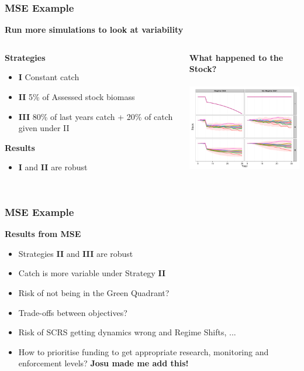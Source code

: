 \begin{frame}\frametitle{MSE Example}
\smallskip\textbf{Run more simulations to look at variability}\smallskip\\
\begin{columns}[t] 
\begin{column}[T]{4cm} %
     \smallskip\textbf{Strategies}\smallskip\\
       \Fontviii
       \begin{itemize}
          \item \textbf{I} Constant catch
          \item \textbf{II} 5\% of Assessed stock biomass
          \item \textbf{III} 80\% of last years catch + 20\% of catch given under II
        \end{itemize}
     \smallskip\textbf{Results}\smallskip\\
       \Fontviii
       \begin{itemize}
          \item \textbf{I} and \textbf{II} are robust
        \end{itemize}
     \end{column}
 \begin{column}[T]{6cm}
 \smallskip\textbf{What happened to the Stock?}\smallskip\\ 
  \includegraphics[height=48mm,width=64mm]{mp5.png}
\end{column}
    \end{columns}    
\end{frame}

\begin{frame}\frametitle{MSE Example}
\smallskip\textbf{Results from MSE}\smallskip\\
       \begin{itemize}[<+->]
          \Fontviii
          \item Strategies \textbf{II} and \textbf{III} are robust
          \item Catch is more variable under Strategy \textbf{II}
          \item Risk of not being in the Green Quadrant?
          \item Trade-offs between objectives?
          \item Risk of SCRS getting dynamics wrong and {\color{blue} Regime Shifts}, ...
          \item How to prioritise funding to get appropriate research, monitoring and enforcement levels? \textbf{Josu made me add this!}
        \end{itemize}
\end{frame}

